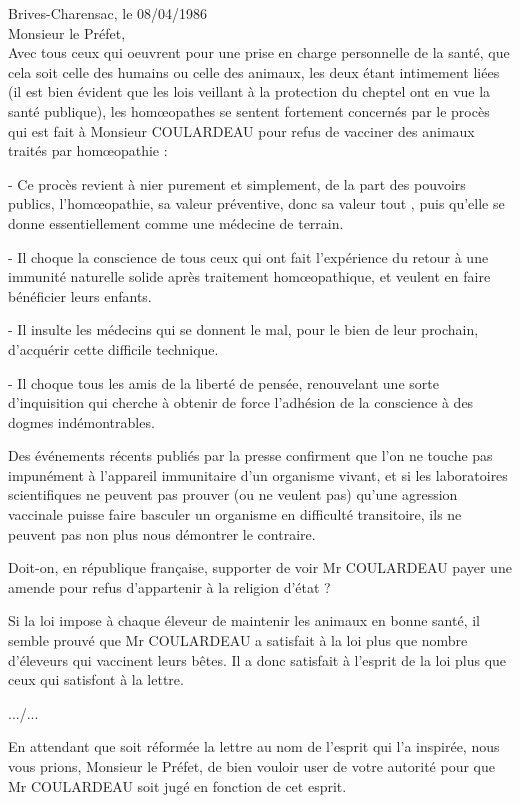 Brives-Charensac, le 08/04/1986\\
Monsieur le Préfet,\\

Avec tous ceux qui oeuvrent pour une prise en charge personnelle de la santé, que cela soit celle des humains ou celle des animaux, les deux étant intimement liées (il est bien évident que les lois veillant à la protection du cheptel ont en vue la santé publique), les homœopathes se sentent fortement concernés par le procès qui est fait à Monsieur COULARDEAU pour refus de vacciner des animaux traités par homœopathie :

- Ce procès revient à nier purement et simplement, de la part des pouvoirs publics, l'homœopathie, sa valeur préventive, donc sa valeur tout , puis qu'elle se donne essentiellement comme une médecine de terrain.

- Il choque la conscience de tous ceux qui ont fait l'expérience du retour à une immunité naturelle solide après traitement homœopathique, et veulent en faire bénéficier leurs enfants.

- Il insulte les médecins qui se donnent le mal, pour le bien de leur prochain, d'acquérir cette difficile technique.

- Il choque tous les amis de la liberté de pensée, renouvelant une sorte d'inquisition qui cherche à obtenir de force l'adhésion de la conscience à des dogmes indémontrables.

Des événements récents publiés par la presse confirment que l'on ne touche pas impunément à l'appareil immunitaire d'un organisme vivant, et si les laboratoires scientifiques ne peuvent pas prouver (ou ne veulent pas) qu'une agression vaccinale puisse faire basculer un organisme en difficulté transitoire, ils ne peuvent pas non plus nous démontrer le contraire.

Doit-on, en république française, supporter de voir Mr COULARDEAU payer une amende pour refus d'appartenir à la religion d'état ?

Si la loi impose à chaque éleveur de maintenir les animaux en bonne santé, il semble prouvé que Mr COULARDEAU a satisfait à la loi plus que nombre d'éleveurs qui vaccinent leurs bêtes. Il a donc satisfait à l'esprit de la loi plus que ceux qui satisfont à la lettre.

\hfill .../...

En attendant que soit réformée la lettre au nom de l'esprit qui l'a inspirée, nous vous prions, Monsieur le Préfet, de bien vouloir user de votre autorité pour que Mr COULARDEAU soit jugé en fonction de cet esprit.

